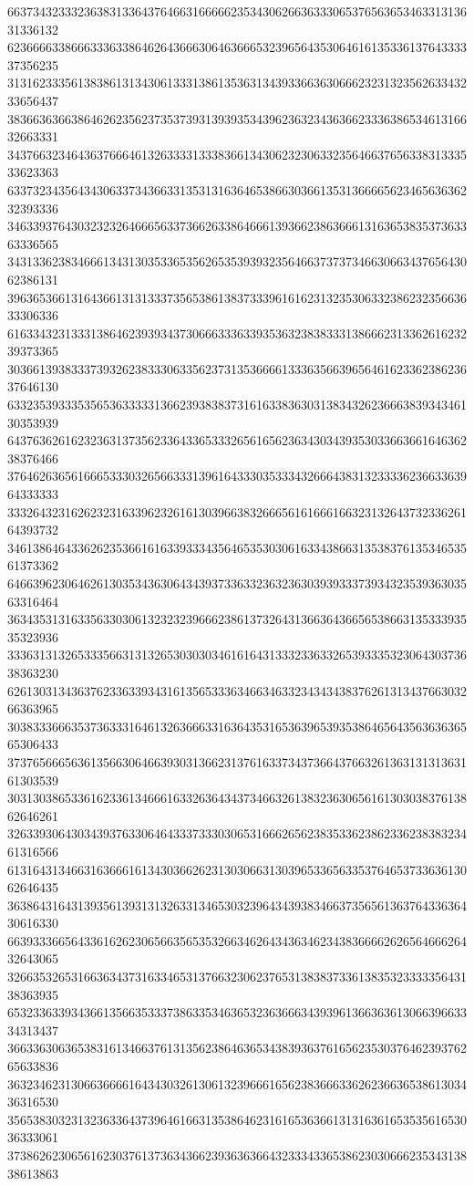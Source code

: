 66373432333236383133643764663166666235343062663633306537656365346331313631336132
62366663386663336338646264366630646366653239656435306461613533613764333337356235
31316233356138386131343061333138613536313439336636306662323132356263343233656437
38366363663864626235623735373931393935343962363234363662333638653461316632663331
34376632346436376664613263333133383661343062323063323564663765633831333533623363
63373234356434306337343663313531316364653866303661353136666562346563636232393336
34633937643032323264666563373662633864666139366238636661316365383537363363336565
34313362383466613431303533653562653539393235646637373734663066343765643062386131
39636536613164366131313337356538613837333961616231323530633238623235663633306336
61633432313331386462393934373066633363393536323838333138666231336261623239373365
30366139383337393262383330633562373135366661333635663965646162336238623637646130
63323539333535653633333136623938383731616338363031383432623666383934346130353939
64376362616232363137356233643365333265616562363430343935303366366164636238376466
37646263656166653330326566333139616433303533343266643831323333623663363964333333
33326432316262323163396232616130396638326665616166616632313264373233626164393732
34613864643362623536616163393334356465353030616334386631353837613534653561373362
64663962306462613035343630643439373363323632363039393337393432353936303563316464
36343531316335633030613232323966623861373264313663643665653866313533393535323936
33363131326533356631313265303030346161643133323363326539333532306430373638363230
62613031343637623363393431613565333634663463323434343837626131343766303266363965
30383336663537363331646132636663316364353165363965393538646564356363636565306433
37376566656361356630646639303136623137616337343736643766326136313131363161303539
30313038653361623361346661633263643437346632613832363065616130303837613862646261
32633930643034393763306464333733303065316662656238353362386233623838323461316566
61316431346631636661613430366262313030663130396533656335376465373363613062646435
36386431643139356139313132633134653032396434393834663735656136376433636430616330
66393336656433616262306566356535326634626434363462343836666262656466626432643065
32663532653166363437316334653137663230623765313838373361383532333335643138363935
65323363393436613566353337386335346365323636663439396136636361306639663334313437
36633630636538316134663761313562386463653438393637616562353037646239376265633836
36323462313066366661643430326130613239666165623836663362623663653861303436316530
35653830323132363364373964616631353864623161653636613131636165353561653036333061
37386262306561623037613736343662393636366432333433653862303066623534313838613863
